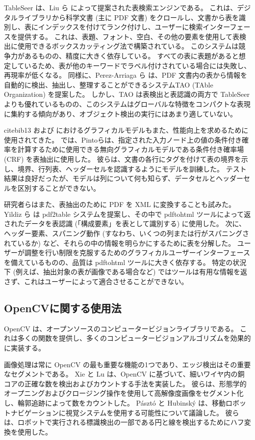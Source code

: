 \documentclass[uplatex, twocolumn,10pt]{jsarticle}
\begin{document}
TableSeer は、Liu ら \cite{bib11} によって提案された表検索エンジンである。
これは、デジタルライブラリから科学文書 (主に PDF 文書) をクロールし、文書から表を識別し、表にインデックスを付けてランク付けし、ユーザーに検索インターフェースを提供する。
これは、表題、フォント、空白、その他の要素を使用して表検出に使用できるボックスカッティング法で構築されている。
このシステムは競争力があるものの、精度に大きく依存している。
すべての表に表題があると想定しているため、表が他のキーワードでラベル付けされている場合には失敗し、再現率が低くなる。
同様に、Perez-Arriaga ら \cite{bib12} は、PDF 文書内の表から情報を自動的に検出、抽出し、整理することができるシステムTAO (TAble Organization) を提案した。
しかし、TAO は表検出と表認識の両方で TableSeer よりも優れているものの、このシステムはグローバルな特徴をコンパクトな表現に集約する傾向があり、オブジェクト検出の実行にはあまり適していない。

cite{bib13} および \cite{bib14} におけるグラフィカルモデルもまた、性能向上を求めるために使用されてきた。
\cite{bib14}では、Pintoらは、指定された入力ノード上の値の条件付き確率を計算するために使用できる無向グラフィカルモデルである条件付き確率場 (CRF) を表抽出に使用した。
彼らは、文書の各行にタグを付けて表の境界を示し、境界、行列表、ヘッダーセルを認識するようにモデルを訓練した。
テスト結果は良好だったが、モデルは列について何も知らず、データセルとヘッダーセルを区別することができない。

研究者らはまた、表抽出のために PDF を XML に変換することも試みた。
Yildiz ら \cite{bib01} は pdf2table システムを提案し、その中で pdftohtml ツールによって返されたデータを表認識 (「構成要素」を表として識別する) に使用した。
次に、ヘッダー要素、スパニング動作 (すなわち、いくつの列または行がスパニングされているか) など、それらの中の情報を明らかにするために表を分解した。
ユーザーが調整を行い制限を克服するためのグラフィカルユーザーインターフェースを備えているものの、品質は pdftohtml ツールに大きく依存する。
特定の状況下 (例えば、抽出対象の表が画像である場合など) ではツールは有用な情報を返さず、これはユーザーによって適合させることができない。

\subsection{OpenCVに関する使用法}
OpenCV \cite{bib15} は、オープンソースのコンピュータービジョンライブラリである。
これは多くの関数を提供し、多くのコンピュータービジョンアルゴリズムを効果的に実装する。

画像処理は常に OpenCV の最も重要な機能の1つであり、エッジ検出はその重要なセグメントである。
Xie と Lu \cite{bib16} は、OpenCV に基づいて、細いワイヤ内の銅コアの正確な数を検出およびカウントする手法を実装した。
彼らは、形態学的オープニングおよびクロージング操作を使用して高解像度画像をセグメント化し、輪郭追跡によって数をカウントした。
Pásztó と Hubinský \cite{bib17} は、移動ロボットナビゲーションに視覚システムを使用する可能性について議論した。
彼らは、ロボットで実行される標識検出の一部である円と線を検出するためにハフ変換を使用した。
\end{document}
